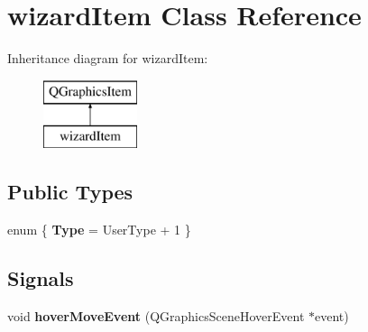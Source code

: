 \hypertarget{classwizard_item}{}\section{wizard\+Item Class Reference}
\label{classwizard_item}
Inheritance diagram for wizard\+Item\+:\begin{figure}[H]
\begin{center}
\leavevmode
\includegraphics[height=2.000000cm]{classwizard_item}
\end{center}
\end{figure}
\subsection*{Public Types}
\begin{DoxyCompactItemize}
\item 
\mbox{\label{classwizard_item_a57c2160fece3cb9b246e39ef3f88616f}} 
enum \{ {\bfseries Type} = User\+Type + 1
 \}
\end{DoxyCompactItemize}
\subsection*{Signals}
\begin{DoxyCompactItemize}
\item 
\mbox{\label{classwizard_item_a5b26ec8a6270393cf0b7a4d440745d0e}} 
void {\bfseries hover\+Move\+Event} (Q\+Graphics\+Scene\+Hover\+Event $\ast$event)
\end{DoxyCompactItemize}

